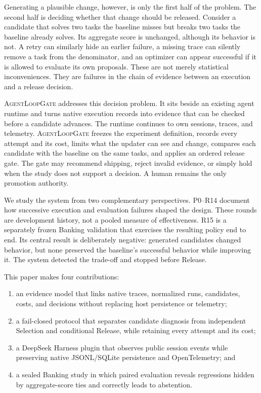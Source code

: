 \documentclass[10pt,twocolumn]{article}
\newcommand{\system}{\textsc{AgentLoopGate}\xspace}
\begin{document}
Generating a plausible change, however, is only the first half of the problem.
The second half is deciding whether that change should be released. Consider a
candidate that solves two tasks the baseline misses but breaks two tasks the
baseline already solves. Its aggregate score is unchanged, although its
behavior is not. A retry can similarly hide an earlier failure, a missing trace
can silently remove a task from the denominator, and an optimizer can appear
successful if it is allowed to evaluate its own proposals. These are not
merely statistical inconveniences. They are failures in the chain of evidence
between an execution and a release decision.

\system addresses this decision problem. It sits beside an existing agent
runtime and turns native execution records into evidence that can be checked
before a candidate advances. The runtime continues to own sessions, traces,
and telemetry. \system freezes the experiment definition, records every
attempt and its cost, limits what the updater can see and change, compares each
candidate with the baseline on the same tasks, and applies an ordered release
gate. The gate may recommend shipping, reject invalid evidence, or simply hold
when the study does not support a decision. A human remains the only promotion
authority.

We study the system from two complementary perspectives. P0--R14 document how
successive execution and evaluation failures shaped the design. These rounds
are development history, not a pooled measure of effectiveness. R15 is a
separately frozen Banking validation that exercises the resulting policy end
to end. Its central result is deliberately negative: generated candidates
changed behavior, but none preserved the baseline's successful behavior while
improving it. The system detected the trade-off and stopped before Release.

This paper makes four contributions:

\begin{enumerate}[leftmargin=*,nosep]
  \item an evidence model that links native traces, normalized runs,
  candidates, costs, and decisions without replacing host persistence or
  telemetry;
  \item a fail-closed protocol that separates candidate diagnosis from
  independent Selection and conditional Release, while retaining every attempt
  and its cost;
  \item a DeepSeek Harness plugin that observes public session events while
  preserving native JSONL/SQLite persistence and OpenTelemetry; and
  \item a sealed Banking study in which paired evaluation reveals regressions
  hidden by aggregate-score ties and correctly leads to abstention.
\end{enumerate}
\end{document}
